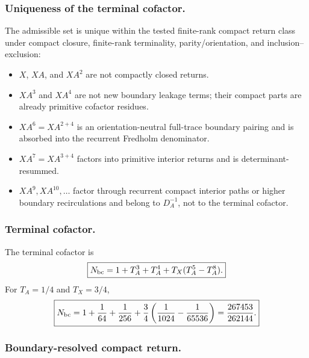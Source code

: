 \documentclass[11pt]{article}
\begin{document}
\subsubsection{Uniqueness of the terminal cofactor.}
\label{app:terminal-cofactor-uniqueness}

The admissible set is unique within the tested finite-rank compact return class under compact closure, finite-rank terminality, parity/orientation, and inclusion--exclusion:
\begin{itemize}
\item \(X\), \(XA\), and \(XA^2\) are not compactly closed returns.
\item \(XA^3\) and \(XA^4\) are not new boundary leakage terms; their compact parts are already primitive cofactor residues.
\item \(XA^6=XA^{2+4}\) is an orientation-neutral full-trace boundary pairing and is absorbed into the recurrent Fredholm denominator.
\item \(XA^7=XA^{3+4}\) factors into primitive interior returns and is determinant-resummed.
\item \(XA^9, XA^{10},\ldots\) factor through recurrent compact interior paths or higher boundary recirculations and belong to \(D_A^{-1}\), not to the terminal cofactor.
\end{itemize}

\subsubsection{Terminal cofactor.}
\label{app:terminal-cofactor}

The terminal cofactor is
\begin{equation}
\boxed{
N_{\rm bc}
=
1+T_A^3+T_A^4+T_X(T_A^5-T_A^8).
}
\end{equation}
For \(T_A=1/4\) and \(T_X=3/4\),
\begin{equation}
\boxed{
N_{\rm bc}
=
1+\frac1{64}+\frac1{256}
+
\frac34\left(\frac1{1024}-\frac1{65536}\right)
=
\frac{267453}{262144}.
}
\end{equation}

\subsubsection{Boundary-resolved compact return.}
\label{app:boundary-return}
\end{document}
